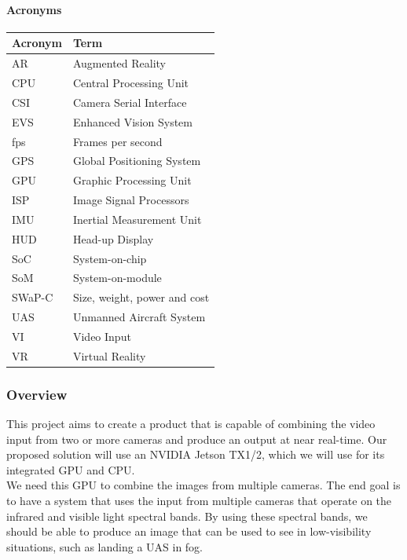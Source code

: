 \paragraph{Acronyms}

\begin{tabular}{|l|l|}
	\hline
	\textbf{Acronym} & \textbf{Term}\\
	\hline
	AR & Augmented Reality\\
	\hline
	CPU & Central Processing Unit\\
	\hline
	CSI & Camera Serial Interface\\
	\hline
	EVS & Enhanced Vision System\\
	\hline
	fps & Frames per second\\
	\hline
	GPS & Global Positioning System\\
	\hline
	GPU & Graphic Processing Unit\\
	\hline
	ISP & Image Signal Processors\\
	\hline
	IMU & Inertial Measurement Unit\\
	\hline
	HUD & Head-up Display\\
	\hline
	SoC & System-on-chip\\
	\hline
	SoM & System-on-module\\
	\hline
	SWaP-C & Size, weight, power and cost\\
	\hline
	UAS & Unmanned Aircraft System\\
	\hline
	VI & Video Input\\
	\hline
	VR & Virtual Reality\\
	\hline
\end{tabular}

\subsubsection{Overview}

This project aims to create a product that is capable of combining the video input from 
two or more cameras and produce an output at near real-time. Our proposed solution 
will use an NVIDIA Jetson TX1/2, which we will use for its integrated GPU and CPU.\\

We need this GPU to combine the images from multiple cameras. The end goal is to have 
a system that uses the input from multiple cameras that operate on the infrared and 
visible light spectral bands. By using these spectral bands, we should be able to 
produce an image that can be used to see in low-visibility situations, such as landing 
a UAS in fog.\\

